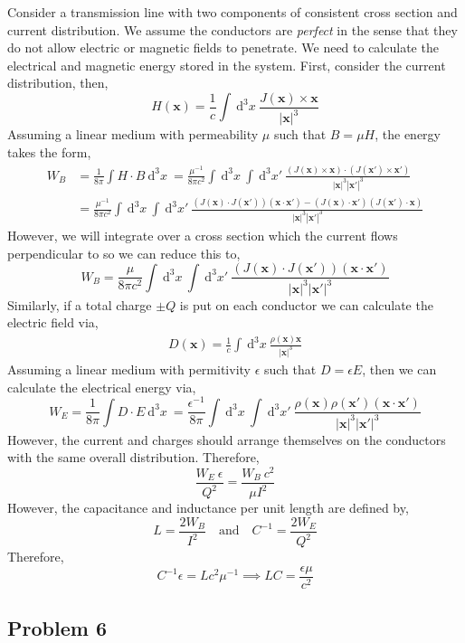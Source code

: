 \documentclass[12pt]{extarticle}
\newcommand{\dn}[2]{\: \mathrm{d}^{#1} #2 \:}
\renewcommand{\bf}[1]{\mathbf{#1}}
\theoremstyle{definition}
\begin{document}
Consider a transmission line with two components of consistent cross section and current distribution. We assume the conductors are \textit{perfect} in the sense that they do not allow electric or magnetic fields to penetrate. We need to calculate the electrical and magnetic energy stored in the system. First, consider the current distribution, then,
\[ H(\bf{x}) = \frac{1}{c} \int \dn{3}{x} \frac{J(\bf{x}) \times \bf{x}}{|\bf{x}|^3} \] 
Assuming a linear medium with permeability $\mu$ such that $B = \mu H$, the energy takes the form,
\begin{align*}
W_B & = \frac{1}{8 \pi} \int H \cdot B \dn{3}{x} = \frac{\mu^{-1}}{8 \pi c^2} \int \dn{3}{x} \int \dn{3}{x'} \frac{(J(\bf{x}) \times \bf{x}) \cdot (J(\bf{x'}) \times \bf{x}')}{|\bf{x}|^3 |\bf{x}'|^3} 
\\
& = \frac{\mu^{-1}}{8 \pi c^2} \int \dn{3}{x} \int \dn{3}{x'} \frac{(J(\bf{x}) \cdot J(\bf{x}')) (\bf{x} \cdot \bf{x}') - (J(\bf{x}) \cdot \bf{x}') (J(\bf{x}') \cdot \bf{x})}{|\bf{x}|^3 |\bf{x}'|^3} 
\end{align*}
However, we will integrate over a cross section which the current flows perpendicular to so we can reduce this to,
\[ W_B = \frac{\mu}{8 \pi c^2} \int \dn{3}{x} \int \dn{3}{x'} \frac{(J(\bf{x}) \cdot J(\bf{x}')) (\bf{x} \cdot \bf{x}')}{|\bf{x}|^3 |\bf{x}'|^3} \]
Similarly, if a total charge $\pm Q$ is put on each conductor we can calculate the electric field via,
\begin{align*}
D(\bf{x}) = \frac{1}{c} \int \dn{3}{x} \frac{\rho(\bf{x}) \bf{x}}{|\bf{x}|^3} 
\end{align*}
Assuming a linear medium with permitivity $\epsilon$ such that $D = \epsilon E$, then we can calculate the electrical energy via,
\[ W_E = \frac{1}{8 \pi} \int D \cdot E \dn{3}{x} = \frac{\epsilon^{-1}}{8 \pi} \int \dn{3}{x} \int \dn{3}{x'} \frac{\rho(\bf{x}) \rho(\bf{x}') (\bf{x} \cdot \bf{x}')}{|\bf{x}|^3 |\bf{x}'|^3} \]
However, the current and charges should arrange themselves on the conductors with the same overall distribution. Therefore, 
\[ \frac{W_E \: \epsilon}{Q^2} = \frac{W_B \: c^2}{\mu I^2} \]
However, the capacitance and inductance per unit length are defined by,
\[ L = \frac{2 W_B}{I^2} \quad \text{and} \quad C^{-1} = \frac{2 W_E}{Q^2} \]
Therefore,
\[ C^{-1} \epsilon = L c^2 \mu^{-1} \implies LC = \frac{\epsilon \mu}{c^2} \]

\subsection{Problem 6}
\end{document}

